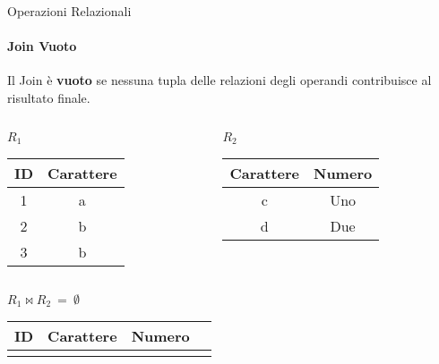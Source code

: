     \begin{frame}{Operazioni Relazionali}
        \framesubtitle{Join Vuoto}
        Il Join \`e \textbf{vuoto} se nessuna tupla delle relazioni degli operandi contribuisce al risultato finale.
        \begin{columns}
            \begin{column}{0.48\textwidth}
                \centering
                {\small $R_1$}
                \newline
        \begin{tabular}{|c|c|}
            \hline
            \rowcolor{cyan!30}ID & Carattere \\
            \hline
            1 & a \\ \hline
            2 & b \\ \hline
            3 & b \\ \hline
            \end{tabular}
            \end{column}
            \begin{column}{0.48\textwidth}
                \centering
                {\small $R_2$}
                \newline
                \begin{tabular}{|c|c|}
                    \hline
                    \rowcolor{cyan!30} Carattere & Numero \\ \hline
                    \cellcolor{red}c & Uno \\ \hline
                    \cellcolor{red}d & Due \\ \hline
                    \end{tabular}
            \end{column}
        \end{columns}
        \vspace{.5cm}
        \centering
        \pause
        $R_1 \bowtie R_2~=~\emptyset$
        \begin{tabular}{|c|c|c|c|}
            \hline
            \rowcolor{cyan!30} ID & Carattere & Numero \\ \hline
            & & \\ \hline
            \end{tabular}
    \end{frame}
